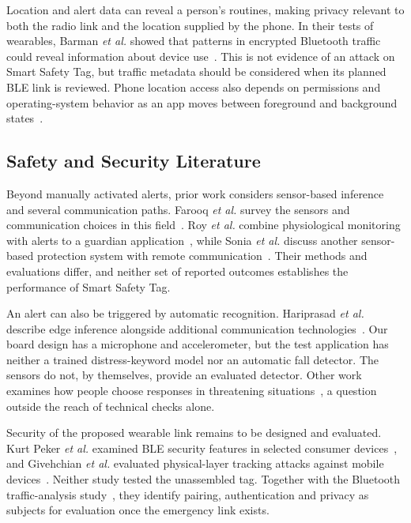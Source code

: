 \documentclass[nolineno]{ieeeaccess}
\begin{document}
Location and alert data can reveal a person's routines, making privacy relevant to both the radio link and the location supplied by the phone. In their tests of wearables, Barman \textit{et al.} showed that patterns in encrypted Bluetooth traffic could reveal information about device use~\cite{barman2021}. This is not evidence of an attack on Smart Safety Tag, but traffic metadata should be considered when its planned BLE link is reviewed. Phone location access also depends on permissions and operating-system behavior as an app moves between foreground and background states~\cite{androidlocation}.


\subsection{Safety and Security Literature}
Beyond manually activated alerts, prior work considers sensor-based inference and several communication paths. Farooq \textit{et al.} survey the sensors and communication choices in this field~\cite{farooq2023}. Roy \textit{et al.} combine physiological monitoring with alerts to a guardian application~\cite{roy2024}, while Sonia \textit{et al.} discuss another sensor-based protection system with remote communication~\cite{sonia2024}. Their methods and evaluations differ, and neither set of reported outcomes establishes the performance of Smart Safety Tag.

An alert can also be triggered by automatic recognition. Hariprasad \textit{et al.} describe edge inference alongside additional communication technologies~\cite{hariprasad2025}. Our board design has a microphone and accelerometer, but the test application has neither a trained distress-keyword model nor an automatic fall detector. The sensors do not, by themselves, provide an evaluated detector. Other work examines how people choose responses in threatening situations~\cite{just2019}, a question outside the reach of technical checks alone.

Security of the proposed wearable link remains to be designed and evaluated. Kurt Peker \textit{et al.} examined BLE security features in selected consumer devices~\cite{peker2022}, and Givehchian \textit{et al.} evaluated physical-layer tracking attacks against mobile devices~\cite{givehchian2022}. Neither study tested the unassembled tag. Together with the Bluetooth traffic-analysis study~\cite{barman2021}, they identify pairing, authentication and privacy as subjects for evaluation once the emergency link exists.
\end{document}
